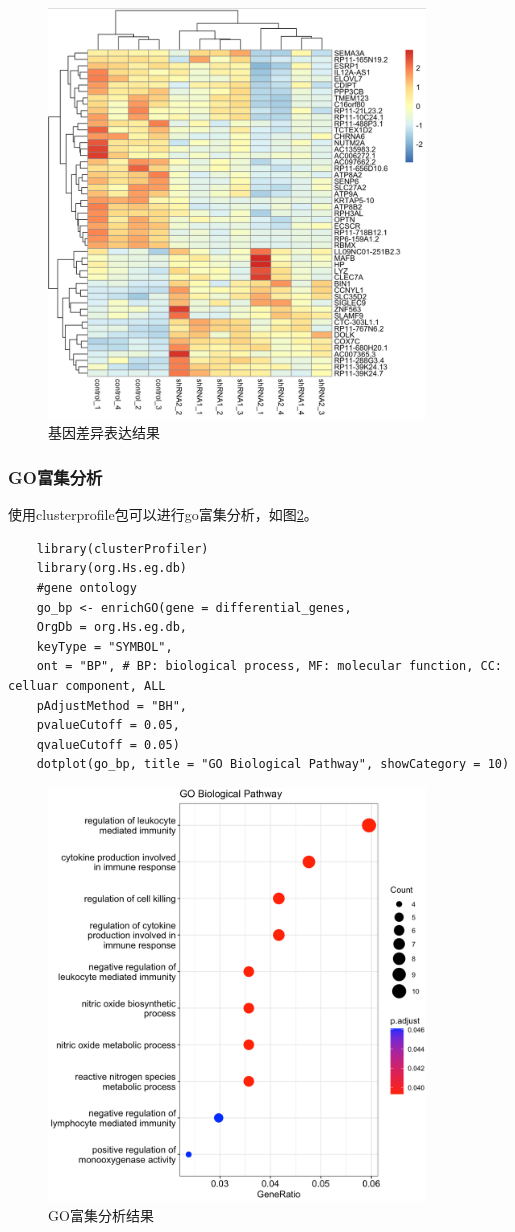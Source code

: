 \begin{figure}[ht]
    \centering
    \includegraphics[width=10cm]{image/rnaseq/heatmap.png}
    \caption{基因差异表达结果}
    \label{dif}
\end{figure}

\subsubsection{GO富集分析}
使用clusterprofile包可以进行go富集分析，如图\ref{go}。
\begin{lstlisting}
    library(clusterProfiler)
    library(org.Hs.eg.db)
    #gene ontology
    go_bp <- enrichGO(gene = differential_genes,
    OrgDb = org.Hs.eg.db,
    keyType = "SYMBOL",
    ont = "BP", # BP: biological process, MF: molecular function, CC: celluar component, ALL
    pAdjustMethod = "BH",
    pvalueCutoff = 0.05,
    qvalueCutoff = 0.05)
    dotplot(go_bp, title = "GO Biological Pathway", showCategory = 10)
\end{lstlisting}

\begin{figure}[ht]
    \centering
    \includegraphics[width=10cm]{image/rnaseq/go.png}
    \caption{GO富集分析结果}
    \label{go}
\end{figure}